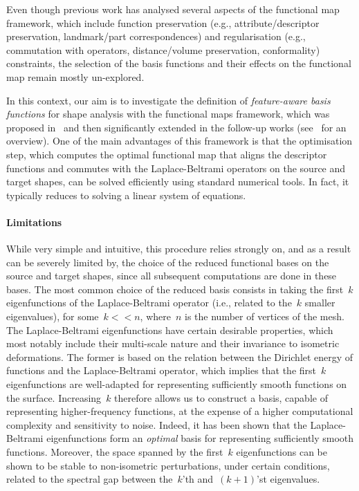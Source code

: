\documentclass[acmtog,authorversion]{acmart}
\begin{document}
Even though previous work has analysed several aspects of the functional map framework, which include function preservation (e.g., attribute/descriptor preservation, landmark/part correspondences) and regularisation (e.g., commutation with operators, distance/volume preservation, conformality) constraints, the selection of the basis functions and their effects on the functional map remain mostly un-explored. 

In this context, our aim is to investigate the definition of \emph{feature-aware basis functions} for shape analysis with the functional maps framework, which was proposed in~\citep{OVSJANIKOV2012} and then significantly extended in the follow-up works (see~\citep{OVSJANIKOV2017-STAR} for an overview). One of the main advantages of this framework is that the optimisation step, which computes the optimal functional map that aligns the descriptor functions and commutes with the Laplace-Beltrami operators on the source and target shapes, can be solved efficiently using standard numerical tools. In fact, it typically reduces to solving a linear system of equations.

\paragraph*{Limitations}
While very simple and intuitive, this procedure relies strongly on, and as a result can be severely limited by, the choice of the reduced functional bases on the source and target shapes, since all subsequent computations are done in these bases. The most common choice of the reduced basis consists in taking the first~$k$ eigenfunctions of the Laplace-Beltrami operator (i.e., related to the~$k$ smaller eigenvalues), for some~$k<<n$, where~$n$ is the number of vertices of the mesh. The Laplace-Beltrami eigenfunctions have certain desirable properties, which most notably include their multi-scale nature and their invariance to isometric deformations. The former is based on the relation between the Dirichlet energy of functions and the Laplace-Beltrami operator, which implies that the first~$k$ eigenfunctions are well-adapted for representing sufficiently smooth functions on the surface. Increasing~$k$ therefore allows us to construct a basis, capable of representing higher-frequency functions, at the expense of a higher computational complexity and sensitivity to noise. Indeed, it has been shown that the Laplace-Beltrami eigenfunctions form an \emph{optimal} basis for representing sufficiently smooth functions. Moreover, the space spanned by the first~$k$ eigenfunctions can be shown to be stable to non-isometric perturbations, under certain conditions, related to the spectral gap between the~$k$'th and~$(k+1)$'st eigenvalues.
\end{document}
